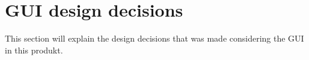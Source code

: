 \section{GUI design decisions}
This section will explain the design decisions that was made considering the GUI in this produkt.



